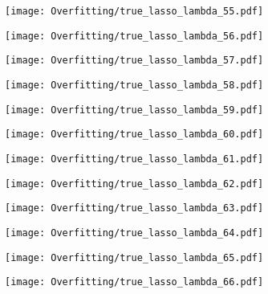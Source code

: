 \documentclass[xcolor=pdftex,dvipsnames,table]{beamer}
\begin{document}
\frame
{
	\begin{center}
		\texttt{[image: Overfitting/true\_lasso\_lambda\_55.pdf]}
	\end{center}
}

\frame
{
	\begin{center}
		\texttt{[image: Overfitting/true\_lasso\_lambda\_56.pdf]}
	\end{center}
}

\frame
{
	\begin{center}
		\texttt{[image: Overfitting/true\_lasso\_lambda\_57.pdf]}
	\end{center}
}

\frame
{
	\begin{center}
		\texttt{[image: Overfitting/true\_lasso\_lambda\_58.pdf]}
	\end{center}
}

\frame
{
	\begin{center}
		\texttt{[image: Overfitting/true\_lasso\_lambda\_59.pdf]}
	\end{center}
}

\frame
{
	\begin{center}
		\texttt{[image: Overfitting/true\_lasso\_lambda\_60.pdf]}
	\end{center}
}

\frame
{
	\begin{center}
		\texttt{[image: Overfitting/true\_lasso\_lambda\_61.pdf]}
	\end{center}
}

\frame
{
	\begin{center}
		\texttt{[image: Overfitting/true\_lasso\_lambda\_62.pdf]}
	\end{center}
}

\frame
{
	\begin{center}
		\texttt{[image: Overfitting/true\_lasso\_lambda\_63.pdf]}
	\end{center}
}

\frame
{
	\begin{center}
		\texttt{[image: Overfitting/true\_lasso\_lambda\_64.pdf]}
	\end{center}
}

\frame
{
	\begin{center}
		\texttt{[image: Overfitting/true\_lasso\_lambda\_65.pdf]}
	\end{center}
}

\frame
{
	\begin{center}
		\texttt{[image: Overfitting/true\_lasso\_lambda\_66.pdf]}
	\end{center}
}
\end{document}

